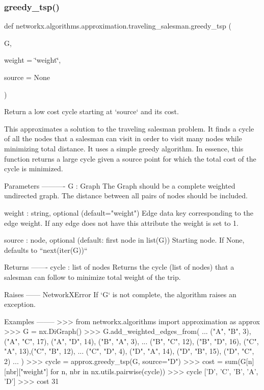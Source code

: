 \subsubsection{\texorpdfstring{greedy\+\_\+tsp()}{greedy\_tsp()}}
{\footnotesize\ttfamily def networkx.\+algorithms.\+approximation.\+traveling\+\_\+salesman.\+greedy\+\_\+tsp (\begin{DoxyParamCaption}\item[{}]{G,  }\item[{}]{weight = {\ttfamily \char`\"{}weight\char`\"{}},  }\item[{}]{source = {\ttfamily None} }\end{DoxyParamCaption})}

\begin{DoxyVerb}Return a low cost cycle starting at `source` and its cost.

This approximates a solution to the traveling salesman problem.
It finds a cycle of all the nodes that a salesman can visit in order
to visit many nodes while minimizing total distance.
It uses a simple greedy algorithm.
In essence, this function returns a large cycle given a source point
for which the total cost of the cycle is minimized.

Parameters
----------
G : Graph
    The Graph should be a complete weighted undirected graph.
    The distance between all pairs of nodes should be included.

weight : string, optional (default="weight")
    Edge data key corresponding to the edge weight.
    If any edge does not have this attribute the weight is set to 1.

source : node, optional (default: first node in list(G))
    Starting node.  If None, defaults to ``next(iter(G))``

Returns
-------
cycle : list of nodes
    Returns the cycle (list of nodes) that a salesman
    can follow to minimize total weight of the trip.

Raises
------
NetworkXError
    If `G` is not complete, the algorithm raises an exception.

Examples
--------
>>> from networkx.algorithms import approximation as approx
>>> G = nx.DiGraph()
>>> G.add_weighted_edges_from({
...     ("A", "B", 3), ("A", "C", 17), ("A", "D", 14), ("B", "A", 3),
...     ("B", "C", 12), ("B", "D", 16), ("C", "A", 13),("C", "B", 12),
...     ("C", "D", 4), ("D", "A", 14), ("D", "B", 15), ("D", "C", 2)
... })
>>> cycle = approx.greedy_tsp(G, source="D")
>>> cost = sum(G[n][nbr]["weight"] for n, nbr in nx.utils.pairwise(cycle))
>>> cycle
['D', 'C', 'B', 'A', 'D']
>>> cost
31


\end{DoxyVerb}
